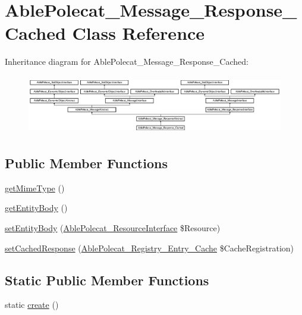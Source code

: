 \hypertarget{class_able_polecat___message___response___cached}{}\section{Able\+Polecat\+\_\+\+Message\+\_\+\+Response\+\_\+\+Cached Class Reference}
\label{class_able_polecat___message___response___cached}
Inheritance diagram for Able\+Polecat\+\_\+\+Message\+\_\+\+Response\+\_\+\+Cached\+:\begin{figure}[H]
\begin{center}
\leavevmode
\includegraphics[height=2.594594cm]{class_able_polecat___message___response___cached}
\end{center}
\end{figure}
\subsection*{Public Member Functions}
\begin{DoxyCompactItemize}
\item 
\hyperlink{class_able_polecat___message___response___cached_ac06e9f7b10fca30eb41e41d4dc108b1c}{get\+Mime\+Type} ()
\item 
\hyperlink{class_able_polecat___message___response___cached_a0841bf6c2f3e1f97f8c789475ee95b05}{get\+Entity\+Body} ()
\item 
\hyperlink{class_able_polecat___message___response___cached_a858ab2a95af7d312509c203de5c6fb11}{set\+Entity\+Body} (\hyperlink{interface_able_polecat___resource_interface}{Able\+Polecat\+\_\+\+Resource\+Interface} \$Resource)
\item 
\hyperlink{class_able_polecat___message___response___cached_abce1b583cd7617705f50c64793aca76d}{set\+Cached\+Response} (\hyperlink{class_able_polecat___registry___entry___cache}{Able\+Polecat\+\_\+\+Registry\+\_\+\+Entry\+\_\+\+Cache} \$Cache\+Registration)
\end{DoxyCompactItemize}
\subsection*{Static Public Member Functions}
\begin{DoxyCompactItemize}
\item 
static \hyperlink{class_able_polecat___message___response___cached_a239b1c70258014a86569483c2d009de6}{create} ()
\end{DoxyCompactItemize}
